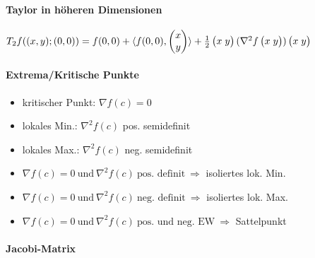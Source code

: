 \documentclass[paper=a3,paper=landscape, fontsize=9pt,DIV=30]{scrartcl}
\begin{document}
\begin{multicols*}{4}
 \paragraph{Taylor in höheren Dimensionen}


 $\arraycolsep=1.4pt\def\arraystretch{1}
 T_2f((x,y);(0,0))=f(0,0)+\langle f(0,0),
 \begin{pmatrix}
   x\\
   y
 \end{pmatrix}
 \rangle + \frac{1}{2}
 \begin{pmatrix}
   x&y
 \end{pmatrix}
 (\nabla^2f
 \begin{pmatrix}
   x&y
 \end{pmatrix}
 )
 \begin{pmatrix}
   x&y
 \end{pmatrix}
 $

  \paragraph{Extrema/Kritische Punkte}
  \begin{itemize}
  	\item kritischer Punkt: $\nabla f(c) = 0$
  	\item lokales Min.: $\nabla^2f(c)$ pos. semidefinit
  	\item lokales Max.: $\nabla^2f(c)$ neg. semidefinit
  	\item $\nabla f(c)=0 \ \text{und}\ \nabla^2f(c) \ \text{pos. definit}\ \Rightarrow$ isoliertes lok. Min.
  	\item  $\nabla f(c)=0 \ \text{und}\ \nabla^2f(c) \ \text{neg. definit}\ \Rightarrow$ isoliertes lok. Max.
  	\item $\nabla f(c)=0 \ \text{und}\ \nabla^2f(c) \ \text{pos. und neg. EW}\ \Rightarrow$ Sattelpunkt
  \end{itemize}

  \paragraph{Jacobi-Matrix}


\end{multicols*}
\end{document}

